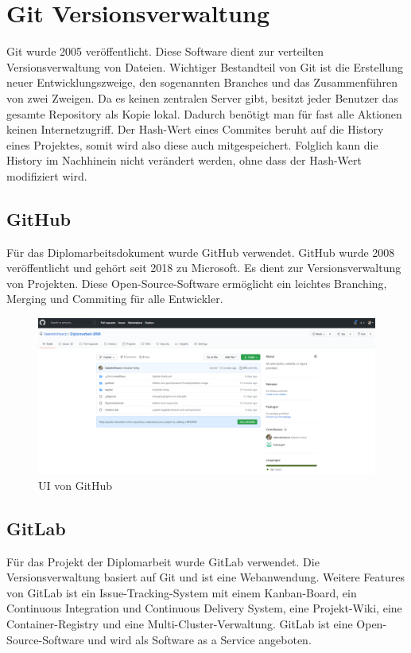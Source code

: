 \section{Git Versionsverwaltung}
Git wurde 2005 veröffentlicht. Diese Software dient zur verteilten Versionsverwaltung von Dateien. Wichtiger Bestandteil von Git ist die Erstellung neuer Entwicklungszweige, den sogenannten Branches und das Zusammenführen von zwei Zweigen. Da es keinen zentralen Server gibt, besitzt jeder Benutzer das gesamte Repository als Kopie lokal. Dadurch benötigt man für fast alle Aktionen keinen Internetzugriff. Der Hash-Wert eines Commites beruht auf die History eines Projektes, somit wird also diese auch mitgespeichert. Folglich kann die History im Nachhinein nicht verändert werden, ohne dass der Hash-Wert modifiziert wird. \autocite{wikiGit}

\subsection{GitHub}
Für das Diplomarbeitsdokument wurde GitHub verwendet. GitHub wurde 2008 veröffentlicht und gehört seit 2018 zu Microsoft. Es dient zur Versionsverwaltung von Projekten. Diese Open-Source-Software ermöglicht ein leichtes Branching, Merging und Commiting für alle Entwickler. \autocite{wikiGitHub}

\begin{figure}[H]
	\centerline{
		\includegraphics[width=1\textwidth, frame]{./grafiken/github_screen.png}
	}
	\vskip0pt
	\caption{UI von GitHub} \label{fig:github}
\end{figure}

\subsection{GitLab}
Für das Projekt der Diplomarbeit wurde GitLab verwendet. Die Versionsverwaltung basiert auf Git und ist eine Webanwendung. Weitere Features von GitLab ist ein Issue-Tracking-System mit einem Kanban-Board, ein Continuous Integration und Continuous Delivery System, eine Projekt-Wiki, eine Container-Registry und eine Multi-Cluster-Verwaltung. GitLab ist eine Open-Source-Software und wird als Software as a Service angeboten. \autocite{wikiGitLab}


